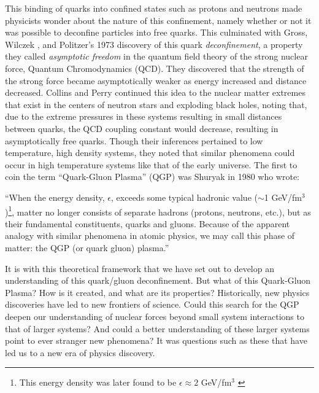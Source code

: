 This binding of quarks into confined states such as protons and neutrons made physicists wonder about the nature of this confinement, namely whether or not it was possible to deconfine particles into free quarks. This culminated with Gross, Wilczek \citep{PhysRevD.8.3633}, and Politzer's \citep{PhysRevLett.30.1346} 1973 discovery of this quark \textit{deconfinement}, a property they called \textit{asymptotic freedom} in the quantum field theory of the strong nuclear force, Quantum Chromodynamics (QCD). They discovered that the strength of the strong force became asymptotically weaker as energy increased and distance decreased. Collins and Perry \citep{Collins:1974ky} continued this idea to the nuclear matter extremes that exist in the centers of neutron stars and exploding black holes, noting that, due to the extreme pressures in these systems resulting in small distances between quarks, the QCD coupling constant would decrease, resulting in asymptotically free quarks. Though their inferences pertained to low temperature, high density systems, they noted that similar phenomena could occur in high temperature systems like that of the early universe. The first to coin the term ``Quark-Gluon Plasma'' (QGP) was Shuryak in 1980 \citep{Shuryak:1980tp} who wrote: 

\begin{addmargin}[1.5em]{2em}``When the energy density, $\epsilon$, exceeds some typical hadronic value ($\sim$1 GeV/fm$^{3}$)\footnote{This energy density was later found to be $\epsilon \approx 2$ GeV/fm$^3$ \citep{Fries:2006pv}}, matter no longer consists of separate hadrons (protons, neutrons, etc.), but as their fundamental constituents, quarks and gluons. Because of the apparent analogy with similar phenomena in atomic physics, we may call this phase of matter: the QGP (or quark gluon) plasma.''
\end{addmargin}
 
It is with this theoretical framework that we have set out to develop an understanding of this quark/gluon deconfinement. But what of this Quark-Gluon Plasma? How is it created, and what are its properties? Historically, new physics discoveries have led to new frontiers of science. Could this search for the QGP deepen our understanding of nuclear forces beyond small system interactions to that of larger systems? And could a better understanding of these larger systems point to ever stranger new phenomena? It was questions such as these that have led us to a new era of physics discovery.

